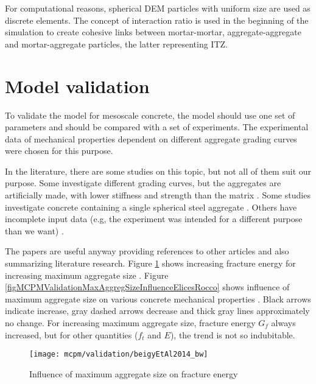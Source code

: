 For computational reasons, spherical DEM particles with uniform size are used as discrete elements.
The concept of interaction ratio is used in the beginning of the simulation to create cohesive links between mortar-mortar, aggregate-aggregate and mortar-aggregate particles, the latter representing ITZ.









\section{Model validation}

To validate the model for mesoscale concrete, the model should use one set of parameters and should be compared with a set of experiments.
The experimental data of mechanical properties dependent on different aggregate grading curves were chosen for this purpose.

In the literature, there are some studies on this topic, but not all of them suit our purpose.
Some investigate different grading curves, but the aggregates are artificially made, with lower stiffness and strength than the matrix \cite{ElicesRocco2008a}.
Some studies investigate concrete containing a single spherical steel aggregate \cite{AkcaogluTokyayCelik2002a,AkcaogluTokyayCelik2004a,AkcaogluTokyayCelik2005a}.
Others have incomplete input data (e.g, the experiment was intended for a different purpose than we want) \cite{GiaccioZerbino1998a,GiaccioZerbinoPonceBatic2008a}.

The papers are useful anyway providing references to other articles and also summarizing literature research.
Figure \ref{figMCPMValidationFracEnergyOnMaxAggregSize} shows increasing fracture energy for increasing maximum aggregate size \cite{BeygiEtAl2014b}.
Figure \ref{figMCPMValidationMaxAggregSizeInfluenceElicesRocco} shows influence of maximum aggregate size on various concrete mechanical properties \cite{ElicesRocco2008a}.
Black arrows indicate increase, gray dashed arrows decrease and thick gray lines approximately no change.
For increasing maximum aggregate size, fracture energy $G_f$ always increased, but for other quantities ($f_t$ and $E$), the trend is not so indubitable.

\begin{figure}[htbp]
	\centering
	\texttt{[image: mcpm/validation/beigyEtAl2014\_bw]}
	\caption[Influence of maximum aggregate size on fracture energy]{Influence of maximum aggregate size on fracture energy \cite{BeygiEtAl2014b}}
	\label{figMCPMValidationFracEnergyOnMaxAggregSize}
\end{figure}

